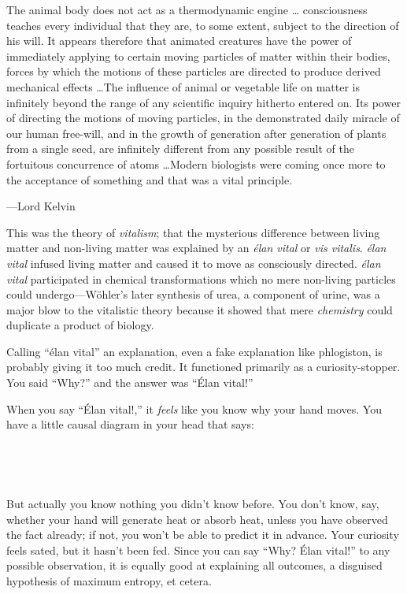 {
 The animal body does not act as a thermodynamic engine \ldots
consciousness teaches every individual that they are, to some extent,
subject to the direction of his will. It appears therefore that
animated creatures have the power of immediately applying to certain
moving particles of matter within their bodies, forces by which the
motions of these particles are directed to produce derived mechanical
effects \ldots The influence of animal or vegetable life on matter is
infinitely beyond the range of any scientific inquiry hitherto entered
on. Its power of directing the motions of moving particles, in the
demonstrated daily miracle of our human free-will, and in the growth of
generation after generation of plants from a single seed, are
infinitely different from any possible result of the fortuitous
concurrence of atoms \ldots Modern biologists were coming once more to
the acceptance of something and that was a vital principle.}

{\raggedleft
 {}---Lord Kelvin
\par}


\bigskip

{
 This was the theory of \textit{vitalism}; that the mysterious
difference between living matter and non-living matter was explained by
an \textit{élan vital} or \textit{vis vitalis}. \textit{élan vital}
infused living matter and caused it to move as consciously directed.
\textit{élan vital} participated in chemical transformations which no
mere non-living particles could undergo---Wöhler's
later synthesis of urea, a component of urine, was a major blow to the
vitalistic theory because it showed that mere \textit{chemistry} could
duplicate a product of biology.}

{
 Calling ``élan vital'' an
explanation, even a fake explanation like phlogiston, is probably
giving it too much credit. It functioned primarily as a
curiosity-stopper. You said ``Why?''
and the answer was ``Élan vital!''}

{
 When you say ``Élan vital!,''
it \textit{feels} like you know why your hand moves. You have a little
causal diagram in your head that says:}

{
 ~}



{
 ~}

{
 But actually you know nothing you didn't know
before. You don't know, say, whether your hand will
generate heat or absorb heat, unless you have observed the fact
already; if not, you won't be able to predict it in
advance. Your curiosity feels sated, but it hasn't been
fed. Since you can say ``Why? Élan
vital!'' to any possible observation, it is equally
good at explaining all outcomes, a disguised hypothesis of maximum
entropy, et cetera.}

